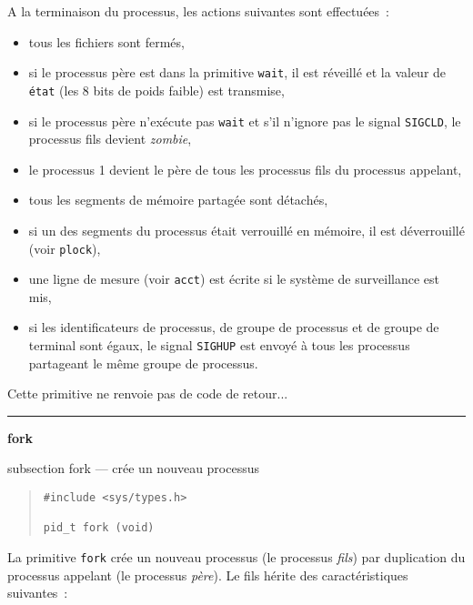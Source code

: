 \documentclass [twoside] {report}
\newcommand {\primitive} [1]
    {
	{\large \bf #1}
	\addcontentsline {toc} {subsection} {#1}
    }
\newcommand {\separation}
    {
	\vspace {7mm}
	\nopagebreak
	\hrule
    }
\begin{document}
A la terminaison du processus, les actions
suivantes sont effectuées~:

\begin {itemize}
\item tous les fichiers sont fermés,
\item si le processus père est dans la primitive
{\tt wait}, il est réveillé et la valeur de {\tt état}
(les 8 bits de poids faible) est transmise,
\item si le processus père n'exécute pas {\tt wait} et
s'il n'ignore pas le signal {\tt SIGCLD}, le
processus fils devient {\it zombie},
\item le processus 1 devient le père de tous les
processus fils du processus appelant,
\item tous les segments de mémoire partagée sont
détachés,
\item si un des segments du processus était
verrouillé en mémoire, il est déverrouillé (voir
{\tt plock}),
\item une ligne de mesure (voir {\tt acct}) est écrite
si le système de surveillance est mis,
\item si les identificateurs de processus, de groupe
de processus et de groupe de terminal sont égaux,
le signal {\tt SIGHUP} est envoyé à tous les
processus partageant le même groupe de
processus.
\end {itemize}

Cette primitive ne renvoie pas de code de
retour...




\separation
\primitive {fork} --- crée un nouveau processus

\begin {quote}
\begin {verbatim}
#include <sys/types.h>

pid_t fork (void)
\end{verbatim}
\end {quote}

La primitive {\tt fork} crée un nouveau processus
(le processus {\it fils})
par duplication du processus appelant (le
processus {\it père}). Le fils hérite des
caractéristiques suivantes~:
\end{document}
